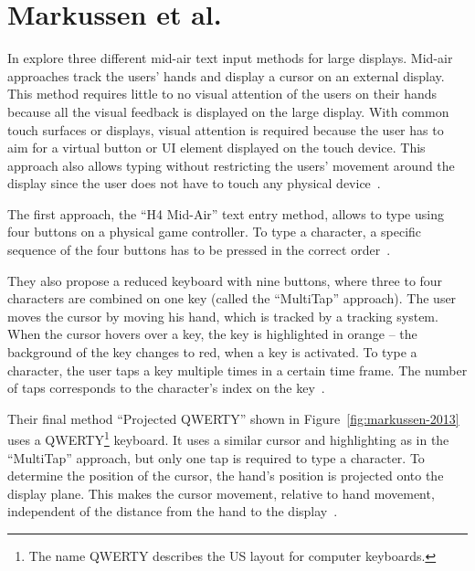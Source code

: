 \section{Markussen et al.\@}\label{section:markussen-2013}
In {} \citeauthor{Markussen.2013} explore three different mid-air text input methods for large displays. Mid-air approaches track the users' hands and display a cursor on an external display. This method requires little to no visual attention of the users on their hands because all the visual feedback is displayed on the large display. With common touch surfaces or displays, visual attention is required because the user has to aim for a virtual button or \gls{UI} element displayed on the touch device.
This approach also allows typing without restricting the users' movement around the display since the user does not have to touch any physical device~\cite[401]{Markussen.2013}.

The first approach, the \enquote{H4 Mid-Air} text entry method, allows to type using four buttons on a physical game controller. To type a character, a specific sequence of the four buttons has to be pressed in the correct order~\cite[406]{Markussen.2013}.

They also propose a reduced keyboard with nine buttons, where three to four characters are combined on one key (called the \enquote{MultiTap} approach). The user moves the cursor by moving his hand, which is tracked by a tracking system. When the cursor hovers over a key, the key is highlighted in orange -- the background of the key changes to red, when a key is activated. To type a character, the user taps a key multiple times in a certain time frame. The number of taps corresponds to the character's index on the key~\cite[407]{Markussen.2013}. %

Their final method \enquote{Projected QWERTY} shown in Figure~\ref{fig:markussen-2013} uses a QWERTY\footnote{The name QWERTY describes the US layout for computer keyboards.} keyboard. It uses a similar cursor and highlighting as in the \enquote{MultiTap} approach, but only one tap is required to type a character. To determine the position of the cursor, the hand's position is projected onto the display plane. This makes the cursor movement, relative to hand movement, independent of the distance from the hand to the display~\cite[408]{Markussen.2013}. 

